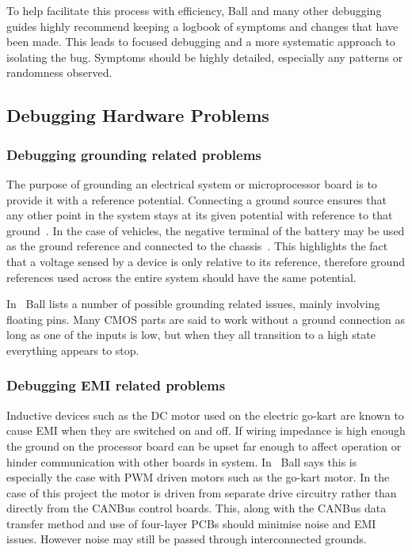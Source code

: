 \documentclass{ENZCon}
\begin{document}
To help facilitate this process with efficiency, Ball and many other debugging guides highly recommend keeping a logbook of symptoms and changes that have been made. This leads to focused debugging and a more systematic approach to isolating the bug. Symptoms should be highly detailed, especially any patterns or randomness observed. 

\subsection{Debugging Hardware Problems}

\subsubsection{Debugging grounding related problems}

The purpose of grounding an electrical system or microprocessor board is to provide it with a reference potential. Connecting a ground source ensures that any other point in the system stays at its given potential with reference to that ground~\cite{grounding_practical}. In the case of vehicles, the negative terminal of the battery may be used as the ground reference and connected to the chassis~\cite{patent}. This highlights the fact that a voltage sensed by a device is only relative to its reference, therefore ground references used across the entire system should have the same potential.

In~\cite{ball_1998_debugging} Ball lists a number of possible grounding related issues, mainly involving floating pins. Many CMOS parts are said to work without a ground connection as long as one of the inputs is low, but when they all transition to a high state everything appears to stop. 

\subsubsection{Debugging EMI related problems}

Inductive devices such as the DC motor used on the electric go-kart are known to cause EMI when they are switched on and off. If wiring impedance is high enough the ground on the processor board can be upset far enough to affect operation or hinder communication with other boards in system. In~\cite{ball_1998_debugging} Ball says this is especially the case with PWM driven motors such as the go-kart motor. In the case of this project the motor is driven from separate drive circuitry rather than directly from the CANBus control boards. This, along with the CANBus data transfer method and use of four-layer PCBs should minimise noise and EMI issues. However noise may still be passed through interconnected grounds. 
\end{document}
